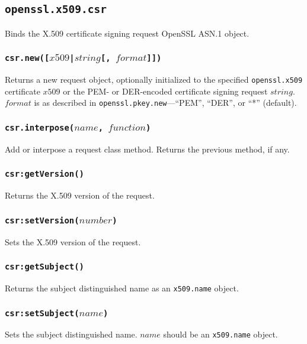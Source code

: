 \documentclass[11pt, oneside]{memoir}
\newcommand*{\fn}[1]{\texttt{#1}\xspace}
\newcommand*{\module}[1]{\texttt{#1}\xspace}
\newcounter{toccols}
\newenvironment{Module}[1]{
	\subsection{\texttt{#1}}
	\addtocontents{toc}{
		\protect\begin{multicols}{\value{toccols}}
	}
}{
	\addtocontents{toc}{\protect\end{multicols}}
}
\begin{document}
\begin{Module}{openssl.x509.csr}

Binds the X.509 certificate signing request OpenSSL ASN.1 object.

\subsubsection[\fn{csr.new}]{\fn{csr.new([$x509$|$string$[, $format$]])}}

Returns a new request object, optionally initialized to the specified \module{openssl.x509} certificate $x509$ or the PEM- or DER-encoded certificate signing request $string$. $format$ is as described in \fn{openssl.pkey.new}---``PEM'', ``DER'', or ``*'' (default).

\subsubsection[\fn{csr.interpose}]{\fn{csr.interpose($name$, $function$)}}

Add or interpose a request class method. Returns the previous method, if any.

\subsubsection[\fn{csr:getVersion}]{\fn{csr:getVersion()}}

Returns the X.509 version of the request.

\subsubsection[\fn{csr:setVersion}]{\fn{csr:setVersion($number$)}}

Sets the X.509 version of the request.

\subsubsection[\fn{csr:getSubject}]{\fn{csr:getSubject()}}

Returns the subject distinguished name as an \module{x509.name} object.

\subsubsection[\fn{csr:setSubject}]{\fn{csr:setSubject($name$)}}

Sets the subject distinguished name. $name$ should be an \module{x509.name} object.


\end{Module}
\end{document}
